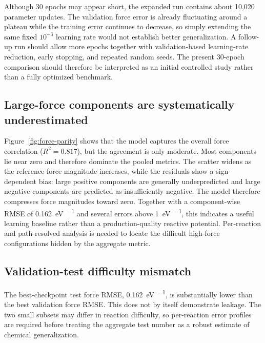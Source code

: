 \documentclass[11pt,a4paper]{article}
\begin{document}
Although 30 epochs may appear short, the expanded run contains about 10,020 parameter
updates. The validation force error is already fluctuating around a plateau while the
training error continues to decrease, so simply extending the same fixed
$10^{-3}$ learning rate would not establish better generalization. A follow-up run
should allow more epochs together with validation-based learning-rate reduction,
early stopping, and repeated random seeds. The present 30-epoch comparison should
therefore be interpreted as an initial controlled study rather than a fully optimized
benchmark.

\subsection{Large-force components are systematically underestimated}

Figure~\ref{fig:force-parity} shows that the model captures the overall force
correlation ($R^2=0.817$), but the agreement is only moderate. Most components lie
near zero and therefore dominate the pooled metrics. The scatter widens as the
reference-force magnitude increases, while the residuals show a sign-dependent bias:
large positive components are generally underpredicted and large negative components
are predicted as insufficiently negative. The model therefore compresses force
magnitudes toward zero. Together with a component-wise RMSE of
\SI{0.162}{eV\per\angstromunit} and several errors above
\SI{1}{eV\per\angstromunit}, this indicates a useful learning baseline rather than a
production-quality reactive potential. Per-reaction and path-resolved analysis is
needed to locate the difficult high-force configurations hidden by the aggregate
metric.

\subsection{Validation-test difficulty mismatch}

The best-checkpoint test force RMSE, \SI{0.162}{eV\per\angstromunit}, is substantially
lower than the best validation force RMSE. This does not by itself demonstrate
leakage. The two small subsets may differ in reaction difficulty, so per-reaction
error profiles are required before treating the aggregate test number as a robust
estimate of chemical generalization.




\end{document}
